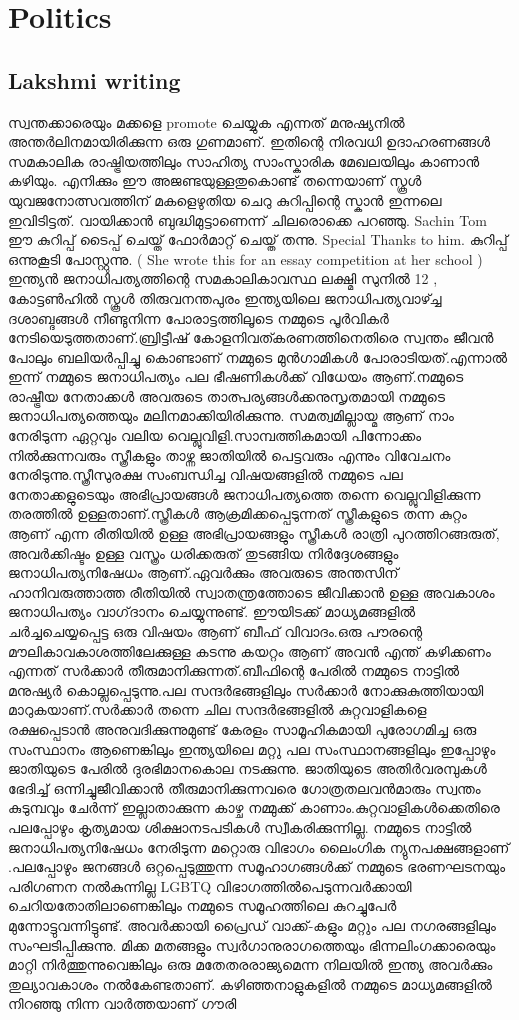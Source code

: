 \documentclass[10pt,a4paper]{report}
\begin{document}
  
  \chapter{Politics}
  
\section{Lakshmi writing}  
  സ്വന്തക്കാരെയും മക്കളെ promote ചെയ്യുക എന്നത് മനുഷ്യനിൽ അന്തർലിനമായിരിക്കുന്ന ഒരു ഗുണമാണ്. ഇതിന്റെ നിരവധി ഉദാഹരണങ്ങൾ സമകാലിക രാഷ്ട്രിയത്തിലും സാഹിത്യ സാംസ്കാരിക മേഖലയിലും കാണാൻ കഴിയും. എനിക്കും ഈ അജണ്ടയുള്ളതുകൊണ്ട് തന്നെയാണ് സ്കൂൾ യുവജനോത്സവത്തിന് മകളെഴുതിയ ചെറു കുറിപ്പിന്റെ സ്കാൻ ഇന്നലെ ഇവിടിട്ടത്. വായിക്കാൻ ബുദ്ധിമുട്ടാണെന്ന് ചിലരൊക്കെ പറഞ്ഞു. Sachin Tom ഈ കുറിപ്പ് ടൈപ്പ് ചെയ്ത് ഫോർമാറ്റ് ചെയ്ത് തന്നു. Special Thanks to him. കുറിപ്പ് ഒന്നുകൂടി പോസ്റ്റുന്നു. ( She wrote this for an essay competition at her school ) ഇന്ത്യൻ ജനാധിപത്യത്തിന്റെ സമകാലികാവസ്ഥ ലക്ഷ്മി സുനിൽ 12 , കോട്ടൺഹിൽ സ്കൂൾ തിരുവനന്തപുരം ഇന്ത്യയിലെ ജനാധിപത്യവാഴ്ച്ച ദശാബ്ദങ്ങൾ നീണ്ടുനിന്ന പോരാട്ടത്തിലൂടെ നമ്മുടെ പൂർവികർ നേടിയെടുത്തതാണ്.ബ്രിട്ടീഷ് കോളനിവത്കരണത്തിനെതിരെ സ്വന്തം ജീവൻ പോലും ബലിയർപ്പിച്ചു കൊണ്ടാണ് നമ്മുടെ മുൻഗാമികൾ പോരാടിയത്.എന്നാൽ ഇന്ന് നമ്മുടെ ജനാധിപത്യം പല ഭീഷണികൾക്ക് വിധേയം ആണ്.നമ്മുടെ രാഷ്ട്രീയ നേതാക്കൾ അവരുടെ താത്പര്യങ്ങൾക്കനുസൃതമായി നമ്മുടെ ജനാധിപത്യത്തെയും മലിനമാക്കിയിരിക്കുന്നു. സമത്വമില്ലായ്മ ആണ് നാം നേരിടുന്ന ഏറ്റവും വലിയ വെല്ലുവിളി.സാമ്പത്തികമായി പിന്നോക്കം നിൽക്കുന്നവരും സ്ത്രീകളും താഴ്ന്ന ജാതിയിൽ പെട്ടവരും എന്നും വിവേചനം നേരിടുന്നു.സ്ത്രീസുരക്ഷ സംബന്ധിച്ച വിഷയങ്ങളിൽ നമ്മുടെ പല നേതാക്കളുടെയും അഭിപ്രായങ്ങൾ ജനാധിപത്യത്തെ തന്നെ വെല്ലുവിളിക്കുന്ന തരത്തിൽ ഉള്ളതാണ്.സ്ത്രീകൾ ആക്രമിക്കപ്പെടുന്നത് സ്ത്രീകളുടെ തന്ന കുറ്റം ആണ് എന്ന രീതിയിൽ ഉള്ള അഭിപ്രായങ്ങളും സ്ത്രീകൾ രാത്രി പുറത്തിറങ്ങരുത്, അവർക്കിഷ്ടം ഉള്ള വസ്ത്രം ധരിക്കരുത് തുടങ്ങിയ നിർദ്ദേശങ്ങളും ജനാധിപത്യനിഷേധം ആണ്.ഏവർക്കും അവരുടെ അന്തസിന് ഹാനിവരുത്താത്ത രീതിയിൽ സ്വാതന്ത്രത്തോടെ ജീവിക്കാൻ ഉള്ള അവകാശം ജനാധിപത്യം വാഗ്‌ദാനം ചെയ്യുന്നുണ്ട്. ഈയിടക്ക് മാധ്യമങ്ങളിൽ ചർച്ചചെയ്യപ്പെട്ട ഒരു വിഷയം ആണ് ബീഫ് വിവാദം.ഒരു പൗരന്റെ മൗലികാവകാശത്തിലേക്കുള്ള കടന്നു കയറ്റം ആണ് അവൻ എന്ത് കഴിക്കണം എന്നത് സർക്കാർ തീരുമാനിക്കുന്നത്.ബീഫിന്റെ പേരിൽ നമ്മുടെ നാട്ടിൽ മനുഷ്യർ കൊല്ലപ്പെടുന്നു.പല സന്ദർഭങ്ങളിലും സർക്കാർ നോക്കുകുത്തിയായി മാറുകയാണ്.സർക്കാർ തന്നെ ചില സന്ദർഭങ്ങളിൽ കുറ്റവാളികളെ രക്ഷപ്പെടാൻ അനുവദിക്കുന്നുമുണ്ട് കേരളം സാമൂഹികമായി പുരോഗമിച്ച ഒരു സംസ്ഥാനം ആണെങ്കിലും ഇന്ത്യയിലെ മറ്റു പല സംസ്ഥാനങ്ങളിലും ഇപ്പോഴും ജാതിയുടെ പേരിൽ ദുരഭിമാനകൊല നടക്കുന്നു. ജാതിയുടെ അതിർവരമ്പുകൾ ഭേദിച്ച് ഒന്നിച്ചുജീവിക്കാൻ തീരുമാനിക്കുന്നവരെ ഗോത്രതലവൻമാരും സ്വന്തം കുടുമ്പവും ചേർന്ന് ഇല്ലാതാക്കുന്ന കാഴ്ച നമ്മുക്ക് കാണാം.കുറ്റവാളികൾക്കെതിരെ പലപ്പോഴും കൃത്യമായ ശിക്ഷാനടപടികൾ സ്വീകരിക്കുന്നില്ല. നമ്മുടെ നാട്ടിൽ ജനാധിപത്യനിഷേധം നേരിടുന്ന മറ്റൊരു വിഭാഗം ലൈംഗിക ന്യുനപക്ഷങ്ങളാണ് .പലപ്പോഴും ജനങ്ങൾ ഒറ്റപ്പെടുത്തുന്ന സമൂഹാഗങ്ങൾക്ക് നമ്മുടെ ഭരണഘടനയും പരിഗണന നൽകുന്നില്ല LGBTQ വിഭാഗത്തിൽപെടുന്നവർക്കായി ചെറിയതോതിലാണെങ്കിലും നമ്മുടെ സമൂഹത്തിലെ കുറച്ചുപേർ മുന്നോട്ടുവന്നിട്ടുണ്ട്. അവർക്കായി പ്രൈഡ് വാ﻿ക്ക്-കളും മറ്റും പല നഗരങ്ങളിലും സംഘടിപ്പിക്കുന്നു. മിക്ക മതങ്ങളും സ്വർഗാനുരാഗത്തെയും ഭിന്നലിംഗക്കാരെയും മാറ്റി നിർത്തുന്നുവെങ്കിലും ഒരു മതേതരരാജ്യമെന്ന നിലയിൽ ഇന്ത്യ അവർക്കും തുല്യാവകാശം നൽകേണ്ടതാണ്. കഴിഞ്ഞനാളുകളിൽ നമ്മുടെ മാധ്യമങ്ങളിൽ നിറഞ്ഞു നിന്ന വാർത്തയാണ് ഗൗരി 
\end{document}
